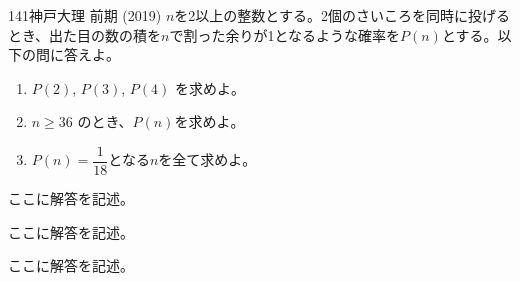 \begin{prob}{141}{}{神戸大理 前期 (2019)}
 $n$を2以上の整数とする。2個のさいころを同時に投げるとき、出た目の数の積を$n$で割った余りが1となるような確率を$P(n)$とする。以下の問に答えよ。
 \begin{enumerate}
  \item $P(2)$, $P(3)$, $P(4)$ を求めよ。
  \item $n\ge 36$ のとき、$P(n)$を求めよ。
  \item $P(n)=\dfrac{1}{18}$となる$n$を全て求めよ。
 \end{enumerate}
\end{prob}
ここに解答を記述。

ここに解答を記述。

ここに解答を記述。